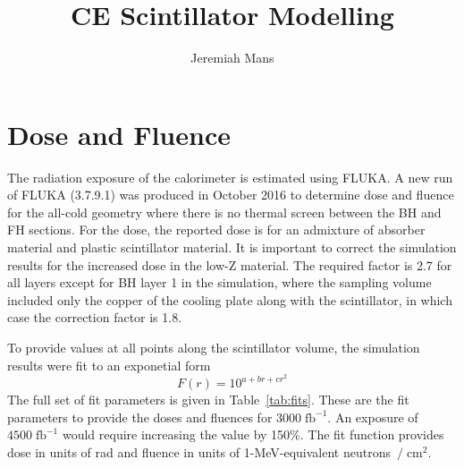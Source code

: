 \documentclass{article}[12pt]
\newcommand{\unit}[1]{\ensuremath{\mathrm{\;#1}}}
\begin{document}
\title{CE Scintillator Modelling}
\author{Jeremiah Mans}
\maketitle

\section{Dose and Fluence}

The radiation exposure of the calorimeter is estimated using FLUKA.  A
new run of FLUKA (3.7.9.1) was produced in October 2016 to determine
dose and fluence for the all-cold geometry where there is no thermal
screen between the BH and FH sections.  For the dose, the reported
dose is for an admixture of absorber material and plastic scintillator
material.  It is important to correct the simulation results for the
increased dose in the low-Z material.  The required factor is 2.7 for
all layers except for BH layer 1 in the simulation, where the sampling
volume included only the copper of the cooling plate along with the
scintillator, in which case the correction factor is 1.8.

To provide values at all points along the scintillator volume, the
simulation results were fit to an exponetial form
\[
F(r) = 10^{a+br+cr^2}
\]
The full set of fit parameters is given in Table~\ref{tab:fits}.
These are the fit parameters to provide the doses and fluences for
$3000\unit{fb^{-1}}$.  An exposure of $4500\unit{fb^{-1}}$ would
require increasing the value by 150\%.  The fit function provides dose
in units of rad and fluence in units of 1-MeV-equivalent
neutrons~$/\unit{cm^2}$.
\end{document}
